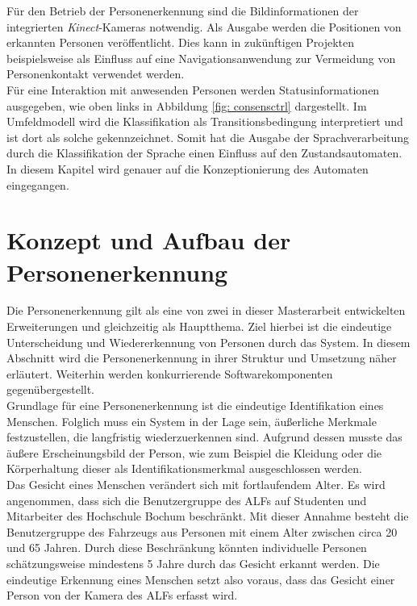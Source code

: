 	Für den Betrieb der Personenerkennung sind die Bildinformationen der integrierten \textit{Kinect}-Kameras notwendig. Als Ausgabe werden die Positionen von erkannten Personen veröffentlicht. Dies kann in zukünftigen Projekten beispielsweise als Einfluss auf eine Navigationsanwendung zur Vermeidung von Personenkontakt verwendet werden.\\
	
	
	
	Für eine Interaktion mit anwesenden Personen werden Statusinformationen ausgegeben, wie oben links in Abbildung \ref{fig: consensctrl} dargestellt. Im Umfeldmodell wird die Klassifikation als Transitionsbedingung interpretiert und ist dort als solche gekennzeichnet. Somit hat die Ausgabe der Sprachverarbeitung durch die Klassifikation der Sprache einen Einfluss auf den Zustandsautomaten. In diesem Kapitel wird genauer auf die Konzeptionierung des Automaten eingegangen.\\
		

	
	
	
	\section{Konzept und Aufbau der Personenerkennung}
	\label{sec: Konzept Personenerkennung}
	
	Die Personenerkennung gilt als eine von zwei in dieser Masterarbeit entwickelten Erweiterungen und gleichzeitig als Hauptthema. Ziel hierbei ist die eindeutige Unterscheidung und Wiedererkennung von Personen durch das System. In diesem Abschnitt wird die Personenerkennung in ihrer Struktur und Umsetzung näher erläutert. Weiterhin werden konkurrierende Softwarekomponenten gegenübergestellt.\\
	
	Grundlage für eine Personenerkennung ist die eindeutige Identifikation eines Menschen. Folglich muss ein System in der Lage sein, äußerliche Merkmale festzustellen, die langfristig wiederzuerkennen sind. Aufgrund dessen musste das äußere Erscheinungsbild der Person, wie zum Beispiel die Kleidung oder die Körperhaltung dieser als Identifikationsmerkmal ausgeschlossen werden.\\
	
	Das Gesicht eines Menschen verändert sich mit fortlaufendem Alter. Es wird angenommen, dass sich die Benutzergruppe des ALFs auf Studenten und Mitarbeiter des Hochschule Bochum beschränkt. Mit dieser Annahme besteht die Benutzergruppe des Fahrzeugs aus Personen mit einem Alter zwischen circa 20 und 65 Jahren. Durch diese Beschränkung könnten individuelle Personen schätzungsweise mindestens 5 Jahre durch das Gesicht erkannt werden. Die eindeutige Erkennung eines Menschen setzt also voraus, dass das Gesicht einer Person von der Kamera des ALFs erfasst wird. \\ 
	
